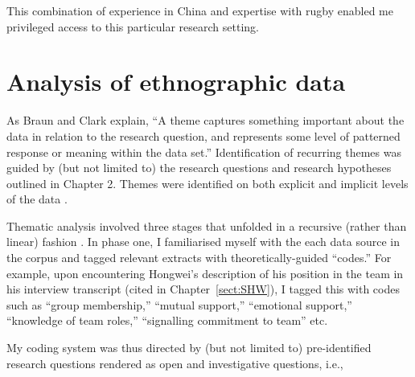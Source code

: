 \begin{CJK}{UTF8}{gbsn}
  This combination of experience in China and expertise with rugby enabled me privileged access to this particular research setting.



\section{Analysis of ethnographic data\label{app3:ethnoAnalysis}}
As Braun and Clark \textcite[10]{Braun2006} explain, ``A theme captures something important about the data in relation to the research question, and represents some level of patterned response or meaning within the data set.''  Identification of recurring themes was guided by (but not limited to) the research questions and research hypotheses outlined in Chapter 2.  Themes were identified on both explicit and implicit levels of the data \citep{Boyatzis1998}.

Thematic analysis involved three stages that unfolded in a recursive (rather than linear) fashion \citep{Braun2006}. In phase one, I familiarised myself with the each data source in the corpus and tagged relevant extracts with theoretically-guided ``codes.'' For example, upon encountering Hongwei's description of his position in the team in his interview transcript (cited in Chapter~\ref{sect:SHW}), I tagged this with codes such as ``group membership,'' ``mutual support,'' ``emotional support,'' ``knowledge of team roles,'' ``signalling commitment to team'' etc.

My coding system was thus directed by (but not limited to) pre-identified research questions rendered as open and investigative questions, i.e.,


\end{CJK}
